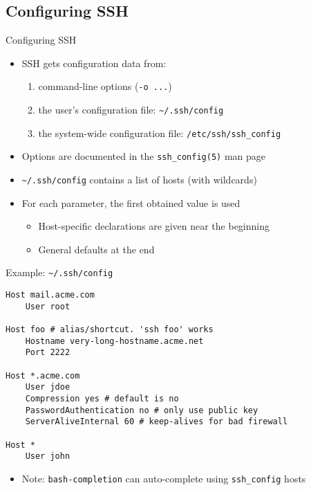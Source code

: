 \documentclass[11pt,final,usepdftitle=false]{beamer}
\newcommand{\tilda}{\textasciitilde{}}
\begin{document}
\subsection{Configuring SSH}
\begin{frame}{Configuring SSH}
	\begin{itemize}
		\item SSH gets configuration data from:
			\begin{enumerate}
				\item command-line options (\texttt{-o ...})
				\item the user's configuration file: \texttt{\tilda/.ssh/config}
				\item the system-wide configuration file: \texttt{/etc/ssh/ssh\_config}
			\end{enumerate}
		\hbr
		\item Options are documented in the \texttt{ssh\_config(5)} man page
		\hbr
		\item \texttt{\tilda/.ssh/config} contains a list of hosts (with wildcards)
		\hbr
		\item For each parameter, the first obtained value is used\\
			\begin{itemize}
				\item Host-specific declarations are given near the beginning
				\item General defaults at the end
			\end{itemize}
	\end{itemize}
\end{frame}

\begin{frame}[fragile]{Example: \texttt{\tilda/.ssh/config}}
\begin{lstlisting}[basicstyle=\ttfamily\small,escapeinside={||}]
Host mail.acme.com
    User root

Host foo # alias/shortcut. 'ssh foo' works
    Hostname very-long-hostname.acme.net
    Port 2222

Host *.acme.com
    User jdoe
    Compression yes # default is no
    PasswordAuthentication no # only use public key
    ServerAliveInternal 60 # keep-alives for bad firewall

Host *
    User john
\end{lstlisting}
\begin{itemize}
	\item Note: \texttt{bash-completion} can auto-complete using \texttt{ssh\_config} hosts
\end{itemize}
\end{frame}
\end{document}
